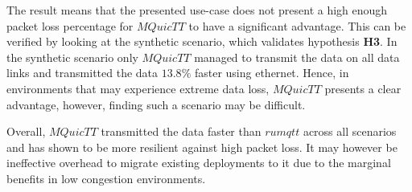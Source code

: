 The result means that the presented use-case does not present a high enough packet loss percentage for $MQuicTT$ to have a significant advantage.
This can be verified by looking at the synthetic scenario, which validates hypothesis \textbf{H3}.
In the synthetic scenario only $MQuicTT$ managed to transmit the data on all data links and transmitted the data $13.8\%$ faster using ethernet.
Hence, in environments that may experience extreme data loss, $MQuicTT$ presents a clear advantage, however, finding such a scenario may be difficult.

Overall, $MQuicTT$ transmitted the data faster than $rumqtt$ across all scenarios and has shown to be more resilient against high packet loss.
It may however be ineffective overhead to migrate existing deployments to it due to the marginal benefits in low congestion environments.